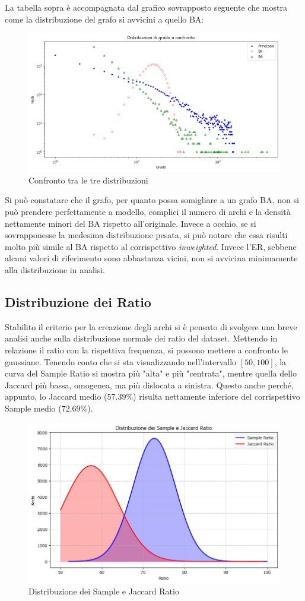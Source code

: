 \documentclass[sigchi]{acmart}
\begin{document}
\noindent La tabella sopra è accompagnata dal grafico sovrapposto seguente che mostra come la distribuzione del grafo si avvicini a quello BA:

\begin{figure}[H]
\centering
\includegraphics[width=0.45
\textwidth]{../network_analysis/plots/2_2/grComparison.png}
\caption{Confronto tra le tre distribuzioni}
\label{fig:grComparison}
\end{figure}

\noindent Si può constatare che il grafo, per quanto possa somigliare a un grafo BA, non si può prendere perfettamente a modello, complici il numero di archi e la densità nettamente minori del BA rispetto all'originale. Invece a occhio, se si sovrapponesse la medesima distribuzione pesata, si può notare che essa risulti molto più simile al BA rispetto al corrispettivo {\itshape inweighted}. Invece l'ER, sebbene alcuni valori di riferimento sono abbastanza vicini, non si avvicina minimamente alla distribuzione in analisi.

\subsection{Distribuzione dei Ratio}

Stabilito il criterio per la creazione degli archi si è pensato di svolgere una breve analisi anche sulla distribuzione normale dei ratio del dataset. Mettendo in relazione il ratio con la rispettiva frequenza, si possono mettere a confronto le gaussiane. Tenendo conto che si sta visualizzando nell'intervallo $[50,100]$, la curva del Sample Ratio si mostra più "alta" e più "centrata", mentre quella dello Jaccard più bassa, omogenea, ma più dislocata a sinistra. Questo anche perché, appunto, lo Jaccard medio ($57.39\%$) risulta nettamente inferiore del corrispettivo Sample medio ($72.69\%$).

\begin{figure}[H]
\centering
\includegraphics[width=0.45
\textwidth]{../network_analysis/plots/2_3/rtDist.png}
\caption{Distribuzione dei Sample e Jaccard Ratio}
\label{fig:rtDist}
\end{figure}
\end{document}
